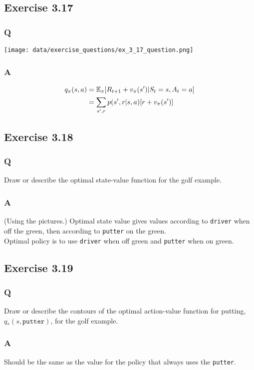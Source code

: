 \subsection{Exercise 3.17}
\subsubsection{Q}
\texttt{[image: data/exercise\_questions/ex\_3\_17\_question.png]}
 
\subsubsection{A} 
\begin{align*}
    q_\pi(s, a) & = \mathbb{E}_\pi[R_{t+1} + v_\pi(s') |S_t = s, A_t = a] \\ 
          & = \sum_{s', r} p(s', r|s, a) [r + v_\pi(s')]
\end{align*}


\subsection{Exercise 3.18}
\subsubsection{Q}
Draw or describe the optimal state-value function for the golf example.

\subsubsection{A}
(Using the pictures.) Optimal state value gives values according to \texttt{driver} when off the green, then according to \texttt{putter} on the green.\\

Optimal policy is to use \texttt{driver} when off green and \texttt{putter} when on green.
 
 
\subsection{Exercise 3.19}
\subsubsection{Q}
 Draw or describe the contours of the optimal action-value function for putting, $q_*(s, \mathtt{putter})$, for the golf example.

\subsubsection{A}
Should be the same as the value for the policy that always uses the \texttt{putter}.

